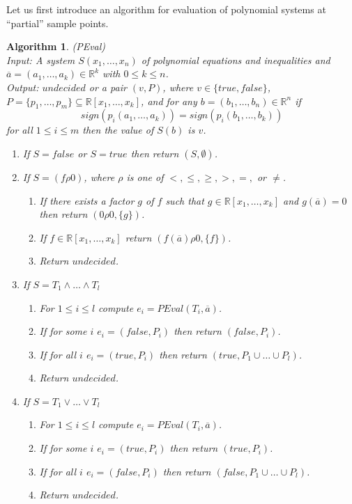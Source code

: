 \documentclass[english]{amsart}
\numberwithin{equation}{section}
\numberwithin{figure}{section}
\newtheorem{algorithm}[thm]{Algorithm}
\begin{document}
Let us first introduce an algorithm for evaluation of polynomial systems
at {}``partial'' sample points.
\begin{algorithm}
\label{alg:PEVAL}(PEval)\\
Input:\emph{ A system }$S(x_{1},\ldots,x_{n})$\emph{ of polynomial
equations and inequalities and $\overline{a}=(a_{1},\ldots,a_{k})\in\mathbb{R}^{k}$
with $0\leq k\leq n$.}\textup{}\\
\textup{\emph{Output:}}\textup{ $undecided$ or a pair $(v,P)$,
where $v\in\{true,false\}$, $P=\{p_{1},\ldots,p_{m}\}\subseteq\mathbb{R}[x_{1},\ldots,x_{k}]$,
and for any $b=(b_{1},\ldots,b_{n})\in\mathbb{R}^{n}$ if \[
sign(p_{i}(a_{1},\ldots,a_{k}))=sign(p_{i}(b_{1},\ldots,b_{k}))\]
 for all $1\leq i\leq m$ then the value of $S(b)$ is $v$. }
\begin{enumerate}
\item If $S=false$ or $S=true$ then return $(S,\emptyset)$.
\item If $S=(f\rho0)$, where $\rho$ is one of $<,\leq,\geq,>,=,$ or $\neq$.

\begin{enumerate}
\item If there exists a factor $g$ of $f$ such that $g\in\mathbb{R}[x_{1},\ldots,x_{k}]$
and $g(\overline{a})=0$ then return $(0\rho0,\{g\})$.
\item If $f\in\mathbb{R}[x_{1},\ldots,x_{k}]$ return $(f(\overline{a})\rho0,\{f\})$.
\item Return $undecided$.
\end{enumerate}
\item If $S=T_{1}\wedge\ldots\wedge T_{l}$

\begin{enumerate}
\item For $1\leq i\leq l$ compute $e_{i}=PEval(T_{i},\overline{a})$.
\item If for some $i$ $e_{i}=(false,P_{i})$ then return $(false,P_{i})$.
\item If for all $i$ $e_{i}=(true,P_{i})$ then return $(true,P_{1}\cup\ldots\cup P_{l})$.
\item Return $undecided$.
\end{enumerate}
\item If $S=T_{1}\vee\ldots\vee T_{l}$

\begin{enumerate}
\item For $1\leq i\leq l$ compute $e_{i}=PEval(T_{i},\overline{a})$.
\item If for some $i$ $e_{i}=(true,P_{i})$ then return $(true,P_{i})$.
\item If for all $i$ $e_{i}=(false,P_{i})$ then return $(false,P_{1}\cup\ldots\cup P_{l})$.
\item Return $undecided$.
\end{enumerate}
\end{enumerate}
\end{algorithm}
\end{document}
